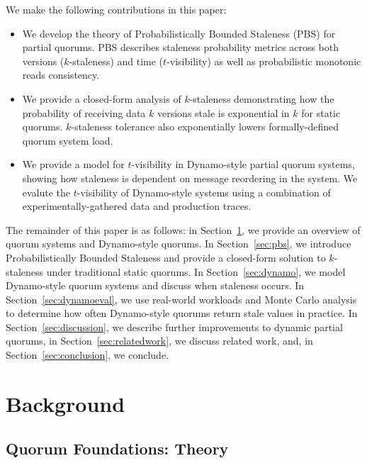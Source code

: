 \documentclass{vldb}
\begin{document}
We make the following contributions in this paper:

\begin{itemize}

\item We develop the theory of Probabilistically Bounded Staleness
  (PBS) for partial quorums. PBS describes staleness probability
  metrics across both versions ($k$-staleness) and time
  ($t$-visibility) as well as probabilistic monotonic reads
  consistency.

\item We provide a closed-form analysis of $k$-staleness demonstrating
  how the probability of receiving data $k$ versions stale is
  exponential in $k$ for static quorums.  $k$-staleness tolerance also
  exponentially lowers formally-defined quorum system load.

\item We provide a model for $t$-visibility in
  Dynamo-style partial quorum systems, showing how
  staleness is dependent on message reordering in the system.  We
  evalute the $t$-visibility of Dynamo-style systems using a
  combination of experimentally-gathered data and production traces.

\end{itemize}

The remainder of this paper is as follows: in
Section~\ref{sec:background}, we provide an overview of quorum systems
and Dynamo-style quorums.  In Section~\ref{sec:pbs}, we introduce
Probabilistically Bounded Staleness and provide a closed-form solution
to $k$-staleness under traditional static quorums.  In
Section~\ref{sec:dynamo}, we model Dynamo-style quorum systems and
discuss when staleness occurs.  In Section~\ref{sec:dynamoeval}, we
use real-world workloads and Monte Carlo analysis to determine how often Dynamo-style quorums return stale values in practice.  In Section~\ref{sec:discussion}, we describe further improvements to dynamic partial quorums, in Section~\ref{sec:relatedwork}, we discuss related work, and, in Section~\ref{sec:conclusion}, we conclude.


\section{Background}
\label{sec:background}

\subsection{Quorum Foundations: Theory}
\end{document}
